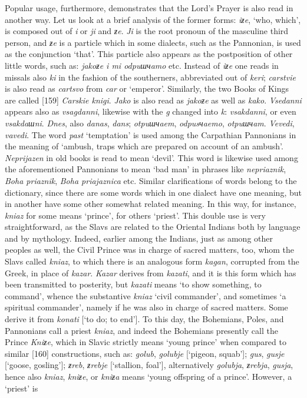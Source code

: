 Popular usage, furthermore, demonstrates that the Lord’s Prayer is also read in another way. Let us look at a brief analysis of the former forms: \textit{iƶe}, ‘who, which’, is composed out of \textit{i} or \textit{ji} and \textit{ƶe}. \textit{Ji} is the root pronoun of the masculine third person, and \textit{ƶe} is a particle which in some dialects, such as the Pannonian, is used as the conjunction ‘that’. This particle also appears as the postposition of other little words, such as: \textit{jakoƶe i mi odpuшчamo} etc. Instead of \textit{iƶe} one reads in missals also \textit{ki} in the fashion of the southerners, abbreviated out of \textit{keri}; \textit{carstvie} is also read as \textit{cartsvo} from \textit{car} or ‘emperor’. Similarly, the two Books of Kings are called [159] \textit{Carskie knigi}. \textit{Jako} is also read as \textit{jakoƶe} as well as \textit{kako}. \textit{Vsedanni} appears also as \textit{vsagdanni}, likewise with the \textit{g} changed into \textit{k}: \textit{vsakdanni}, or even \textit{vsakdaшni}. \textit{Dnes}, also \textit{danas}, \textit{dans}; \textit{otpuшчaem}, \textit{odpusчaemo}, \textit{otpuшчam}. \textit{Vevedi}, \textit{vavedi}. The word \textit{past} ‘temptation’ is used among the Carpathian Pannonians in the meaning of ‘ambush, traps which are prepared on account of an ambush’. \textit{Neprijazen} in old books is read to mean ‘devil’. This word is likewise used among the aforementioned Pannonians to mean ‘bad man’ in phrases like \textit{nepriaznik}, \textit{Boha priaznik}, \textit{Boha priajaznica} etc. Similar clarifications of words belong to the dictionary, since there are some words which in one dialect have one meaning, but in another have some other somewhat related meaning. In this way, for instance, \textit{kniaz} for some means ‘prince’, for others ‘priest’. This double use is very straightforward, as the Slavs are related to the Oriental Indians both by language and by mythology. Indeed, earlier among the Indians, just as among other peoples as well, the Civil Prince was in charge of sacred matters, too, whom the Slavs called \textit{kniaz}, to which there is an analogous form \textit{kagan}, corrupted from the Greek, in place of \textit{kazar}. \textit{Kazar} derives from \textit{kazati}, and it is this form which has been transmitted to posterity, but \textit{kazati} means ‘to show something, to command’, whence the substantive \textit{kniaz} ‘civil commander’, and sometimes ‘a spiritual commander’, namely if he was also in charge of sacred matters. Some derive it from \textit{konati} [‘to do; to end’]. To this day, the Bohemians, Poles, and Pannonians call a priest \textit{kniaz}, and indeed the Bohemians presently call the Prince \textit{Kniƶe}, which in Slavic strictly means ‘young prince’ when compared to similar [160] constructions, such as: \textit{golub}, \textit{golubje} [‘pigeon, squab’]; \textit{gus}, \textit{gusje} [‘goose, gosling’]; \textit{ƶreb}, \textit{ƶrebje} [‘stallion, foal’], alternatively \textit{golubja}, \textit{ƶrebja}, \textit{gusja}, hence also \textit{kniaz}, \textit{kniƶe}, or \textit{kniƶa} means ‘young offspring of a prince’. However, a ‘priest’ is 
